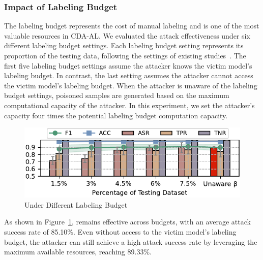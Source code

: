 
\subsubsection{Impact of Labeling Budget}
\label{Sec: Attack Effectiveness under Different Label budget}
The labeling budget represents the cost of manual labeling and is one of the most valuable resources in CDA-AL.
We evaluated the attack effectiveness under six different labeling budget settings.
Each labeling budget setting represents its proportion of the testing data, following the settings of existing studies~\cite{2023-Usenix-chenyizhen}.
The first five labeling budget settings assume the attacker knows the victim model’s labeling budget.
In contrast, the last setting assumes the attacker cannot access the victim model’s labeling budget.
When the attacker is unaware of the labeling budget settings, poisoned samples are generated based on the maximum computational capacity of the attacker. 
In this experiment, we set the attacker’s capacity four times the potential labeling budget computation capacity.
\begin{figure}[h!]
	\centering
	\includegraphics[width=\linewidth,keepaspectratio]{Graph/Evaluation/Figure14_4.pdf}
	\caption{\pandora Under Different Labeling Budget}
	\label{fig:Attack-effectiveness-Label-Budget}
\end{figure}
As shown in Figure~\ref{fig:Attack-effectiveness-Label-Budget}, \pandora remains effective across budgets, with an average attack success rate of 85.10\%.
Even without access to the victim model’s labeling budget, the attacker can still achieve a high attack success rate by leveraging the maximum available resources, reaching 89.33\%.
